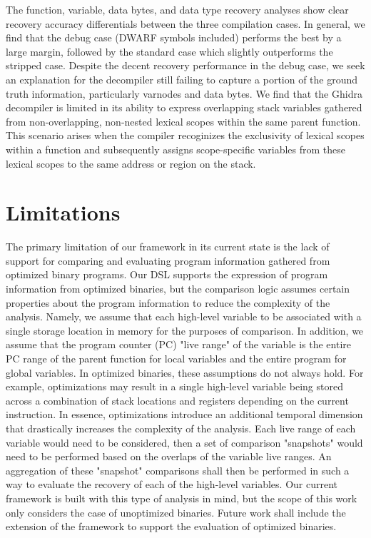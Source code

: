 The function, variable, data bytes, and data type recovery analyses show clear recovery accuracy differentials between the three compilation cases. In general, we find that the debug case (DWARF symbols included) performs the best by a large margin, followed by the standard case which slightly outperforms the stripped case. Despite the decent recovery performance in the debug case, we seek an explanation for the decompiler still failing to capture a portion of the ground truth information, particularly varnodes and data bytes. We find that the Ghidra decompiler is limited in its ability to express overlapping stack variables gathered from non-overlapping, non-nested lexical scopes within the same parent function. This scenario arises when the compiler recoginizes the exclusivity of lexical scopes within a function and subsequently assigns scope-specific variables from these lexical scopes to the same address or region on the stack.

\section{Limitations}

The primary limitation of our framework in its current state is the lack of support for comparing and evaluating program information gathered from optimized binary programs. Our DSL supports the expression of program information from optimized binaries, but the comparison logic assumes certain properties about the program information to reduce the complexity of the analysis. Namely, we assume that each high-level variable to be associated with a single storage location in memory for the purposes of comparison. In addition, we assume that the program counter (PC) "live range" of the variable is the entire PC range of the parent function for local variables and the entire program for global variables. In optimized binaries, these assumptions do not always hold. For example, optimizations may result in a single high-level variable being stored across a combination of stack locations and registers depending on the current instruction. In essence, optimizations introduce an additional temporal dimension that drastically increases the complexity of the analysis. Each live range of each variable would need to be considered, then a set of comparison "snapshots" would need to be performed based on the overlaps of the variable live ranges. An aggregation of these "snapshot" comparisons shall then be performed in such a way to evaluate the recovery of each of the high-level variables. Our current framework is built with this type of analysis in mind, but the scope of this work only considers the case of unoptimized binaries. Future work shall include the extension of the framework to support the evaluation of optimized binaries.

